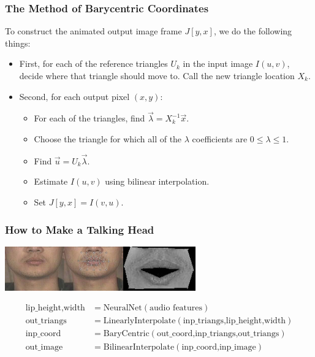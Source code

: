 \documentclass{beamer}
\begin{document}
\begin{frame}
  \frametitle{The Method of Barycentric Coordinates}
  To construct the animated output image frame $J[y,x]$, we do
  the following things:
  \begin{itemize}
  \item First, for each of the reference triangles $U_k$ in the input
    image $I(u,v)$, decide where that triangle
    should move to.  Call the new triangle location $X_k$.
  \item Second, for each output pixel $(x,y)$:
    \begin{itemize}
    \item For each of the triangles, find $\vec\lambda=X_k^{-1}\vec{x}$.
    \item Choose the triangle for which all of the $\lambda$ coefficients
      are $0\le\lambda\le 1$.
    \item Find $\vec{u}=U_k\vec\lambda$.
    \item Estimate $I(u,v)$ using bilinear interpolation.
    \item Set $J[y,x]=I(v,u)$.
    \end{itemize}
  \end{itemize}
\end{frame}

\begin{frame}
  \frametitle{How to Make a Talking Head}
  \centerline{\includegraphics[height=0.75in]{mp7_image_warping_points.jpg}\includegraphics[height=0.75in]{mp7_image_warped.jpg}}
  \begin{align*}
    \mbox{lip\_height,width} &= \mbox{NeuralNet}\left(\mbox{audio features}\right)\\
    \mbox{out\_triangs} &= \mbox{LinearlyInterpolate}\left(\mbox{inp\_triangs,lip\_height,width}\right)\\
    \mbox{inp\_coord} &= \mbox{BaryCentric}\left(\mbox{out\_coord,inp\_triangs,out\_triangs}\right)\\
    \mbox{out\_image} &= \mbox{BilinearInterpolate}\left(\mbox{inp\_coord,inp\_image}\right)
  \end{align*}
\end{frame}
\end{document}
